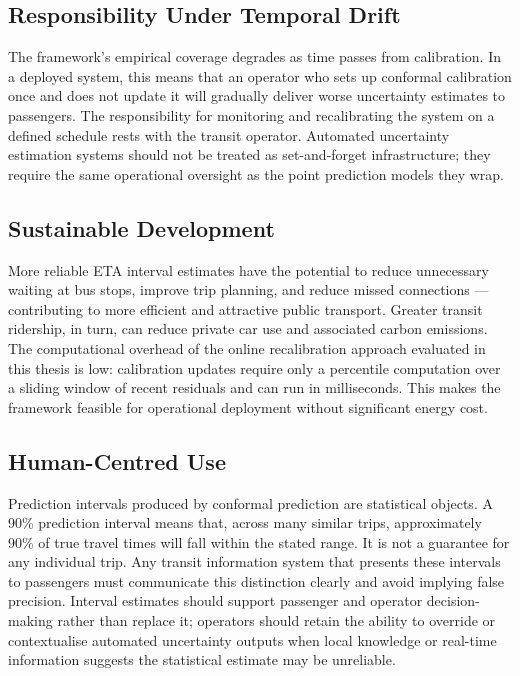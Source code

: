 \documentclass[12pt, a4paper, oneside]{report}
\begin{document}
\subsection{Responsibility Under Temporal Drift}

The framework's empirical coverage degrades as time passes from calibration. In a deployed system, this means that an operator who sets up conformal calibration once and does not update it will gradually deliver worse uncertainty estimates to passengers. The responsibility for monitoring and recalibrating the system on a defined schedule rests with the transit operator. Automated uncertainty estimation systems should not be treated as set-and-forget infrastructure; they require the same operational oversight as the point prediction models they wrap.

\subsection{Sustainable Development}

More reliable ETA interval estimates have the potential to reduce unnecessary waiting at bus stops, improve trip planning, and reduce missed connections --- contributing to more efficient and attractive public transport. Greater transit ridership, in turn, can reduce private car use and associated carbon emissions. The computational overhead of the online recalibration approach evaluated in this thesis is low: calibration updates require only a percentile computation over a sliding window of recent residuals and can run in milliseconds. This makes the framework feasible for operational deployment without significant energy cost.

\subsection{Human-Centred Use}

Prediction intervals produced by conformal prediction are statistical objects. A 90\% prediction interval means that, across many similar trips, approximately 90\% of true travel times will fall within the stated range. It is not a guarantee for any individual trip. Any transit information system that presents these intervals to passengers must communicate this distinction clearly and avoid implying false precision. Interval estimates should support passenger and operator decision-making rather than replace it; operators should retain the ability to override or contextualise automated uncertainty outputs when local knowledge or real-time information suggests the statistical estimate may be unreliable.
\end{document}
